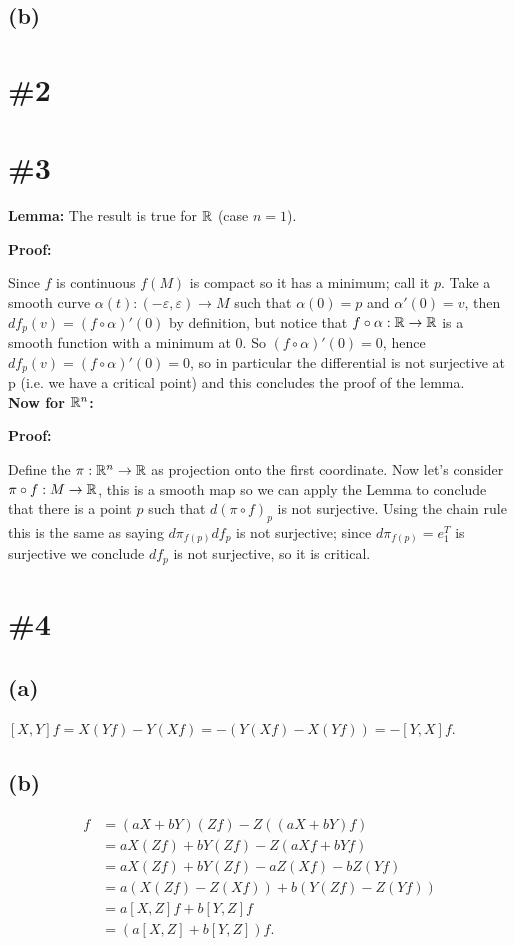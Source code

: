 \documentclass{article}
\begin{document}
\subsection*{(b)}
\section*{\#2}
\section*{\#3}
\textbf{Lemma:} The result is true for $\mathbb{R}$ (case $n=1$).

\textbf{Proof:}

	Since $f$ is continuous $f(M)$ is compact so
	it has a minimum; call it $p$. Take a smooth
	curve
	$\alpha(t):(-\varepsilon,\varepsilon)\to M$
	such that $\alpha(0)=p$ and $\alpha'(0)=v$,
	then $df_p(v)=(f\circ \alpha)'(0)$ by
	definition, but notice that $f\circ\alpha:\mathbb{R}
	\to\mathbb{R}$ is a smooth function with a minimum at
	0. So $(f\circ \alpha)'(0)=0$, hence
	$df_p(v)=(f\circ \alpha)'(0)=0$, so in
	particular the differential is not surjective
	at p (i.e. we have a critical point) and this
	concludes the proof of the lemma.\\
	\textbf{Now for $\mathbb{R}^n$:}

\textbf{Proof:}

	Define the $\pi:\mathbb{R}^n\to\mathbb{R}$ as projection onto
	the first coordinate. Now let's consider
	$\pi\circ f:M\to\mathbb{R}$, this is a smooth map so
	we can apply the Lemma to conclude that there
	is a point $p$ such that $d(\pi\circ f)_p$ is
	not surjective. Using the chain rule this is
	the same as saying $d\pi_{f(p)}df_p$ is not
	surjective; since $d\pi_{f(p)}=e_1^T$ is
	surjective we conclude $df_p$ is not
	surjective, so it is critical.

\section*{\#4}

\subsection*{(a)}
$[X,Y]f=X(Yf)-Y(Xf)=-(Y(Xf)-X(Yf))=-[Y,X]f$.

\subsection*{(b)}
\begin{align*}
[aX+bY,Z]f
&=(aX+bY)(Zf)-Z((aX+bY)f)\\
&=aX(Zf)+bY(Zf)-Z(aXf+bYf)\\
&=aX(Zf)+bY(Zf)-aZ(Xf)-bZ(Yf)\\
&=a(X(Zf)-Z(Xf))+b(Y(Zf)-Z(Yf))\\
&=a[X,Z]f+b[Y,Z]f\\
&=(a[X,Z]+b[Y,Z])f.
\end{align*}
\end{document}
